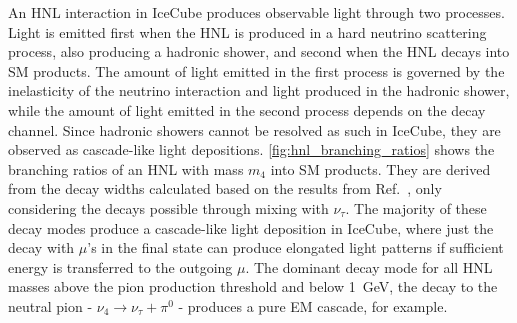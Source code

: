 \documentclass[
    aps,
    prd,
    reprint,
    amsmath,
    amssymb,
    nofootinbib,
    superscriptaddress,
    floatfix
]{revtex4-2}
\newcommand{\gev}{\giga\electronvolt}
\begin{document}
An HNL interaction in IceCube produces observable light through two processes.
Light is emitted first when the HNL is produced in a hard neutrino scattering process, also producing a hadronic shower, and second when the HNL decays into SM products.
The amount of light emitted in the first process is governed by the inelasticity of the neutrino interaction and light produced in the hadronic shower, while the amount of light emitted in the second process depends on the decay channel.
Since hadronic showers cannot be resolved as such in IceCube, they are observed as cascade-like light depositions. \cref{fig:hnl_branching_ratios} shows the branching ratios of an HNL with mass $m_4$ into SM products. They are derived from the decay widths calculated based on the results from Ref.~\cite{Coloma:2020lgy}, only considering the decays possible through mixing with $\nu_\tau$.
The majority of these decay modes produce a cascade-like light deposition in IceCube, where just the decay with $\mu$'s in the final state can produce elongated light patterns if sufficient energy is transferred to the outgoing $\mu$. 
The dominant decay mode for all HNL masses above the pion production threshold and below \SI{1}{\gev}, the decay to the neutral pion - $\nu_4 \to \nu_\tau + \pi^0$ - produces a pure EM cascade, for example.
\end{document}
